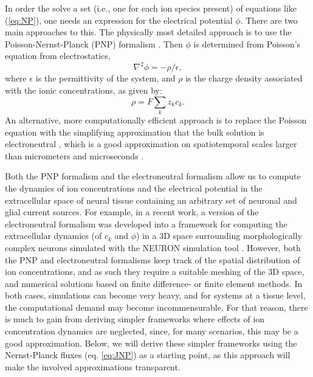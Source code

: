\documentclass[preprint,11pt,authoryear]{elsarticle}
\begin{document}
In order the solve a set (i.e., one for each ion species present) of equations like (\ref{eq:NP}), one needs an expression for the electrical potential $\phi$. There are two main approaches to this. The physically most detailed approach is to use the Poisson-Nernst-Planck (PNP) formalism \citep{Leonetti1998, Leonetti2004, Lu2007, Lopreore2008, Nanninga2008, Pods2013, Gardner2015}. Then $\phi$ is determined from Poisson's equation from electrostatics, 
\begin{equation}
\nabla^2 \phi = -\rho/\epsilon, 
\label{eq:poisson}
\end{equation}
where $\epsilon$ is the permittivity of the system, and $\rho$ is the charge density associated with the ionic concentrations, as given by:
\begin{equation}
\rho = F \sum_k z_k c_k.
\label{eq:F}
\end{equation}
An alternative, more computationally efficient approach is to replace the Poisson equation with the simplifying approximation that the bulk solution is electroneutral \citep{Mori2008, Mori2009, Mori2009a, Mori2011, Halnes2015, Halnes2013, Halnes2015arxiv, Pods2017, Niederer2013, OConnell2016, Solbra2018}, which is a good approximation on spatiotemporal scales larger than micrometers and microseconds \citep{Grodzinsky2011, Pods2017, Solbra2018}. 

Both the PNP formalism and the electroneutral formalism allow us to compute the dynamics of ion concentrations and the electrical potential in the extracellular space of neural tissue containing an arbitrary set of neuronal and glial current sources. For example, in a recent work, a version of the electroneutral formalism was developed into a framework for computing the extracellular dynamics (of $c_k$ and $\phi$) in a 3D space surrounding morphologically complex neurons simulated with the NEURON simulation tool \citep{Solbra2018}. However, both the PNP and electroneutral formalisms keep track of the spatial distribution of ion concentrations, and as such they require a suitable meshing of the 3D space, and numerical solutions based on finite difference- or finite element methods. In both cases, simulations can become very heavy, and for systems at a tissue level, the computational demand may become incommensurable. For that reason, there is much to gain from deriving simpler frameworks where effects of ion concentration dynamics are neglected, since, for many scenarios, this may be a good approximation. Below, we will derive these simpler frameworks using the Nernst-Planck fluxes (eq. \ref{eq:JNP}) as a starting point, as this approach will make the involved approximations transparent.
\end{document}
